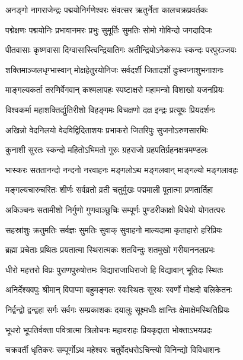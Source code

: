 \twolineshloka
{अनङ्गो नागराजेन्द्रः पद्मयोनिर्गणेश्वरः}
{संवत्सर ऋतुर्नेता कालचक्रप्रवर्तकः}%

\twolineshloka
{पद्मेक्षणः पद्मयोनिः प्रभावानमरः प्रभुः}
{सुमूर्तिः सुमतिः सोमो गोविन्दो जगदादिजः}%

\twolineshloka
{पीतवासाः कृष्णवासा दिग्वासास्त्विन्द्रियातिगः}
{अतीन्द्रियोऽनेकरूपः स्कन्दः परपुरञ्जयः}%

\twolineshloka
{शक्तिमाञ्जलधृग्भास्वान् मोक्षहेतुरयोनिजः}
{सर्वदर्शी  जितादर्शो दुःस्वप्नाशुभनाशनः}%

\twolineshloka
{माङ्गल्यकर्ता तरणिर्वेगवान् कश्मलापहः}
{स्पष्टाक्षरो महामन्त्रो विशाखो यजनप्रियः}%

\twolineshloka
{विश्वकर्मा महाशक्तिर्द्युतिरीशो विहङ्गमः}
{विचक्षणो दक्ष इन्द्रः प्रत्यूषः प्रियदर्शनः}%

\twolineshloka
{अखिन्नो वेदनिलयो वेदविद्विदिताशयः}
{प्रभाकरो जितरिपुः सुजनोऽरुणसारथिः}%

\twolineshloka
{कुनाशी सुरतः स्कन्दो महितोऽभिमतो गुरुः}
{ग्रहराजो ग्रहपतिर्ग्रहनक्षत्रमण्डलः}%

\twolineshloka
{भास्करः सततानन्दो नन्दनो नरवाहनः}
{मङ्गलोऽथ मङ्गलवान् माङ्गल्यो मङ्गलावहः}%

\twolineshloka
{मङ्गल्यचारुचरितः शीर्णः सर्वव्रतो व्रती}
{चतुर्मुखः पद्ममाली पूतात्मा प्रणतार्तिहा}%

\twolineshloka
{अकिञ्चनः सतामीशो निर्गुणो गुणवाञ्छुचिः}
{सम्पूर्णः पुण्डरीकाक्षो विधेयो योगतत्परः}%

\twolineshloka
{सहस्रांशुः क्रतुमतिः सर्वज्ञः सुमतिः सुवाक्}
{सुवाहनो माल्यदामा कृताहारो हरिप्रियः}%

\twolineshloka
{ब्रह्मा प्रचेताः प्रथितः प्रयतात्मा स्थिरात्मकः}
{शतविन्दुः शतमुखो गरीयाननलप्रभः}%

\twolineshloka
{धीरो महत्तरो विप्रः पुराणपुरुषोत्तमः}
{विद्याराजाधिराजो हि विद्यावान् भूतिदः स्थितः}%

\twolineshloka
{अनिर्देश्यवपुः श्रीमान् विपाप्मा बहुमङ्गलः}
{स्वःस्थितः सुरथः स्वर्णो मोक्षदो बलिकेतनः}%

\twolineshloka
{निर्द्वन्द्वो द्वन्द्वहा सर्गः सर्वगः सम्प्रकाशकः}
{दयालुः सूक्ष्मधीः क्षान्तिः क्षेमाक्षेमस्थितिप्रियः}%

\twolineshloka
{भूधरो भूपतिर्वक्ता पवित्रात्मा त्रिलोचनः}
{महावराहः प्रियकृद्दाता भोक्ताऽभयप्रदः}%

\twolineshloka
{चक्रवर्ती धृतिकरः सम्पूर्णोऽथ महेश्वरः}
{चतुर्वेदधरोऽचिन्त्यो विनिन्द्यो विविधाशनः}%

